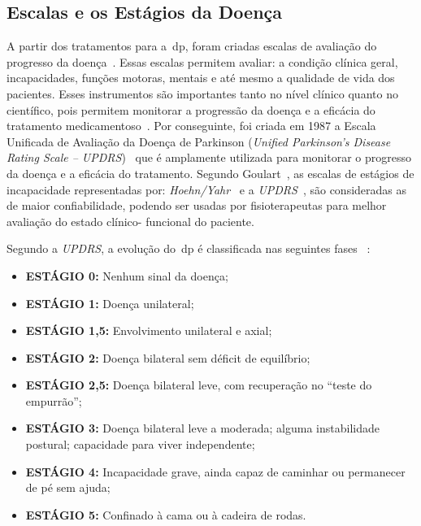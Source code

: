 \subsection{Escalas e os Estágios da Doença}\label{section:escalas_avaliacao}
A partir dos tratamentos para a~\ac{dp}, foram criadas escalas de avaliação do progresso da doença~\cite{updrs87,Hoehn_Yahr_2001}. Essas escalas permitem avaliar: a condição clínica geral, incapacidades, funções motoras, mentais e até mesmo a qualidade de vida dos pacientes. Esses instrumentos são importantes tanto no nível clínico quanto no científico, pois permitem monitorar a progressão da doença e a eficácia do tratamento medicamentoso~\cite{updrs87,goul05}.  Por conseguinte, foi criada em 1987 a Escala Unificada de Avaliação da  Doença de Parkinson (\textit{Unified Parkinson’s Disease Rating Scale – UPDRS})~\cite{updrs87} que é amplamente utilizada para monitorar o progresso da doença e a eficácia do tratamento. Segundo Goulart~\cite{goul05}, as escalas de estágios de incapacidade representadas por: \textit{Hoehn/Yahr}~\cite{Hoehn_Yahr_2001} e a \textit{UPDRS}~\cite{updrs87}, são consideradas as de maior confiabilidade, podendo ser usadas por fisioterapeutas para melhor avaliação do estado clínico-
funcional do  paciente.%

Segundo a \textit{UPDRS}, a evolução do~\ac{dp} é classificada nas seguintes fases ~\cite{updrs87}:
  \begin{itemize}
    \item \textbf{ESTÁGIO 0:} Nenhum sinal da doença;
    \item \textbf{ESTÁGIO 1:} Doença unilateral;
    \item \textbf{ESTÁGIO 1,5:} Envolvimento unilateral e axial;
    \item \textbf{ESTÁGIO 2:} Doença bilateral sem déficit de equilíbrio;
    \item \textbf{ESTÁGIO 2,5:} Doença bilateral leve, com recuperação no “teste do empurrão”;
    \item \textbf{ESTÁGIO 3:} Doença bilateral leve a moderada; alguma instabilidade postural; capacidade para viver independente;
    \item \textbf{ESTÁGIO 4:} Incapacidade grave, ainda capaz de caminhar ou permanecer de pé sem ajuda;
    \item \textbf{ESTÁGIO 5:} Confinado à cama ou à cadeira de rodas.
  \end{itemize}


